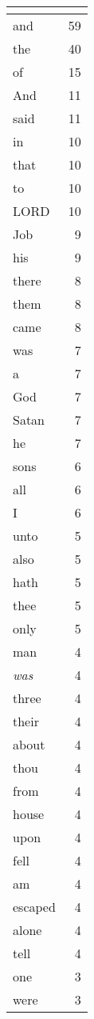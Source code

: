 \begin{center}
\begin{longtable}{l|r}
\hline \multicolumn{2}{c}{{ }} \\ \hline
\endfoot 
and & 59\\ \hline 
the & 40\\ \hline 
of & 15\\ \hline 
And & 11\\ \hline 
said & 11\\ \hline 
in & 10\\ \hline 
that & 10\\ \hline 
to & 10\\ \hline 
LORD & 10\\ \hline 
Job & 9\\ \hline 
his & 9\\ \hline 
there & 8\\ \hline 
them & 8\\ \hline 
came & 8\\ \hline 
was & 7\\ \hline 
a & 7\\ \hline 
God & 7\\ \hline 
Satan & 7\\ \hline 
he & 7\\ \hline 
sons & 6\\ \hline 
all & 6\\ \hline 
I & 6\\ \hline 
unto & 5\\ \hline 
also & 5\\ \hline 
hath & 5\\ \hline 
thee & 5\\ \hline 
only & 5\\ \hline 
man & 4\\ \hline 
\emph{was} & 4\\ \hline 
three & 4\\ \hline 
their & 4\\ \hline 
about & 4\\ \hline 
thou & 4\\ \hline 
from & 4\\ \hline 
house & 4\\ \hline 
upon & 4\\ \hline 
fell & 4\\ \hline 
am & 4\\ \hline 
escaped & 4\\ \hline 
alone & 4\\ \hline 
tell & 4\\ \hline 
one & 3\\ \hline 
were & 3\\ \hline 

\end{longtable}
\end{center}
